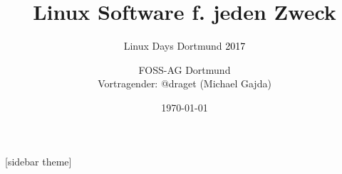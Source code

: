 \documentclass{beamer}
\author{
  FOSS-AG Dortmund \\
  Vortragender: @draget (Michael Gajda)
}
\date{\today}
\title{Linux Software f. jeden Zweck}
\subtitle{Linux Days Dortmund \textcolor{black}{2017}}
\begin{document}
\begin{frame}
    \titlepage
\end{frame}



[sidebar theme]
\makeatletter

%














\end{document}
